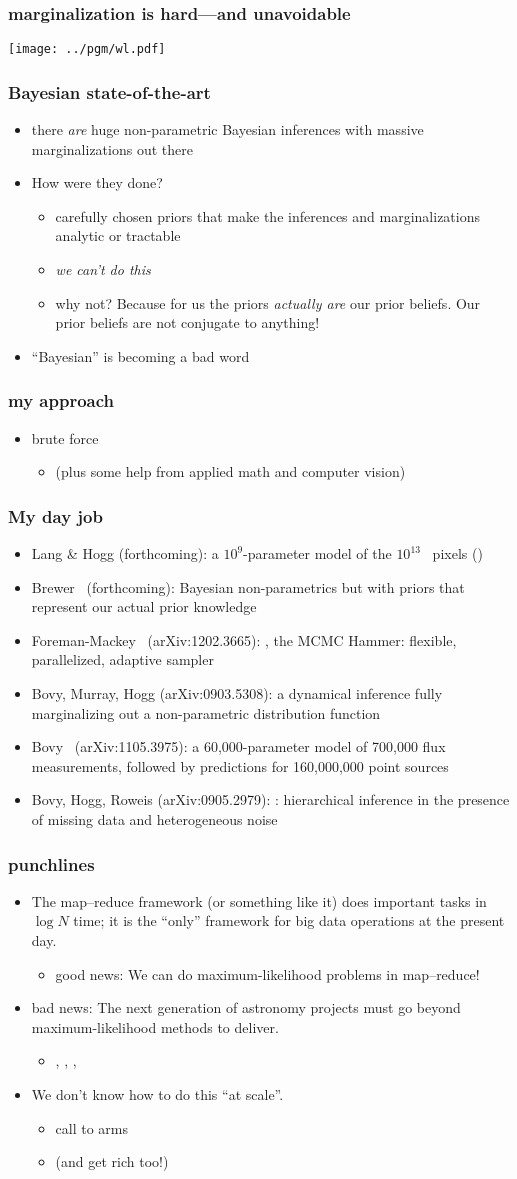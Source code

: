 \documentclass[pdftex]{beamer}
\newcommand{\conclusion}{
\begin{frame}
  \frametitle{punchlines}
  \begin{itemize}
  \item The map--reduce framework (or something like it) does
    important tasks in $\log N$ time; it is the ``only'' framework
    for big data operations at the present day.
    \begin{itemize}
    \item good news: We can do maximum-likelihood problems in map--reduce!
    \end{itemize}
  \item bad news:  The next generation of astronomy projects must go beyond
    maximum-likelihood methods to deliver.
    \begin{itemize}
    \item \gaia, \lsst, \euclid, \etc
    \end{itemize}
  \item We don't know how to do this ``at scale''.
    \begin{itemize}
    \item call to arms
    \item (and get rich too!)
    \end{itemize}
  \end{itemize}
\end{frame}
}
\begin{document}
\begin{frame}
  \frametitle{marginalization is hard---and unavoidable}
  \texttt{[image: ../pgm/wl.pdf]}
\end{frame}

\begin{frame}
  \frametitle{Bayesian state-of-the-art}
  \begin{itemize}
  \item there \emph{are} huge non-parametric Bayesian inferences with
    massive marginalizations out there
  \item How were they done?
    \begin{itemize}
    \item carefully chosen priors that make the inferences and
      marginalizations analytic or tractable
    \item \emph{we can't do this}
    \item why not?  Because for us the priors \emph{actually are} our
      prior beliefs.  Our prior beliefs are not conjugate to anything!
    \end{itemize}
  \item ``Bayesian'' is becoming a bad word
  \end{itemize}
\end{frame}

\begin{frame}
  \frametitle{my approach}
  \begin{itemize}
  \item brute force
    \begin{itemize}
    \item (plus some help from applied math and computer vision)
    \end{itemize}
  \end{itemize}
\end{frame}

\begin{frame}
  \frametitle{My day job}
  \begin{itemize}
  \item Lang \& Hogg {\small(forthcoming)}: a $10^9$-parameter model of the
    $10^{13}$ \sdss\ pixels ()
  \item Brewer \etal\ {\small(forthcoming)}: Bayesian non-parametrics but with
    priors that represent our actual prior knowledge
  \item Foreman-Mackey \etal\ {\small(arXiv:1202.3665)}:
    , the MCMC Hammer: flexible, parallelized, adaptive
    sampler
  \item Bovy, Murray, Hogg {\small(arXiv:0903.5308)}: a dynamical inference
    fully marginalizing out a non-parametric distribution function
  \item Bovy \etal\ {\small(arXiv:1105.3975)}: a 60,000-parameter model of
    700,000 flux measurements, followed by predictions for 160,000,000
    point sources
  \item Bovy, Hogg, Roweis {\small(arXiv:0905.2979)}: : hierarchical inference in the presence of missing
    data and heterogeneous noise
  \end{itemize}
\end{frame}

\conclusion
\end{document}
